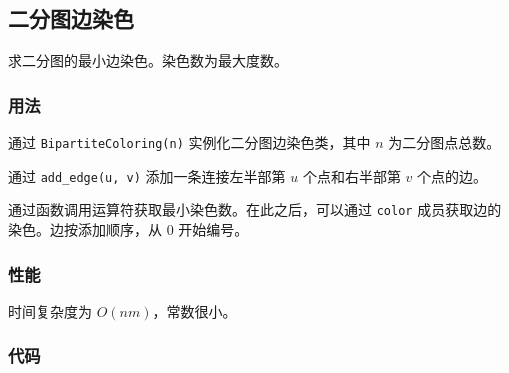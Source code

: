 \subsection{二分图边染色}

求二分图的最小边染色。染色数为最大度数。

\subsubsection{用法}

通过 \lstinline{BipartiteColoring(n)} 实例化二分图边染色类，其中 $n$ 为二分图点总数。

通过 \lstinline{add_edge(u, v)} 添加一条连接左半部第 $u$ 个点和右半部第 $v$ 个点的边。

通过函数调用运算符获取最小染色数。在此之后，可以通过 \lstinline{color} 成员获取边的染色。边按添加顺序，从 $0$ 开始编号。

\subsubsection{性能}

时间复杂度为 $O(nm)$，常数很小。

\subsubsection{代码}


